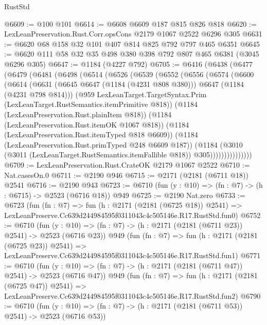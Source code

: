 \begin{lexlean}{RustStd}
\begin{coremodule}
@6609 := @100 @101
@6614 := @6608 @6609 @187 @815 @826 @818
@6620 := LexLeanPreservation.Rust.Corr.opsCons @2179 @1067 @2522 @6296 @305
@6631 := @6620 @68 @158 @32 @101 @407 @814 @825 @792 @797 @465 @6351
@6645 := @6620 @111 @58 @32 @35 @498 @380 @398 @792 @807 @465 @6381 (@3045 @6296 @305)
@6647 := @1184 (@4227 @792)
@6705 := @6416
    (@6438
      (@6477
        (@6479
          (@6481
            (@6498
              (@6514
                (@6526
                  (@6539
                    (@6552
                      (@6556
                        (@6574
                          (@6600
                            (@6614
                              (@6631
                                (@6645 @6647 (@1184 (@4231 @808 @380)))
                                @6647
                                (@1184 (@4231 @798 @814)))
                              (@959
                                LexLeanTarget.TargetSyntax.Prim
                                (LexLeanTarget.RustSemantics.itemPrimitive @818))
                              (@1184 (LexLeanPreservation.Rust.plainItem @818))
                              (@1184 (LexLeanPreservation.Rust.itemOK @1067 @818))
                              (@1184 (LexLeanPreservation.Rust.itemTyped @818 @6609))
                              (@1184 (LexLeanPreservation.Rust.primTyped @248 @6609 @187))
                              (@1184
                                (@3010
                                  (@3011 (LexLeanTarget.RustSemantics.itemFallible @818))
                                  @305)))))))))))))))
@6709 := LexLeanPreservation.Rust.CrateOK @2179 @1067 @2522
@6710 := Nat.casesOn.{0}
@6711 := @2190 @946
@6715 := @2171 (@2181 (@6711 @18)) @2541
@6716 := @2190 @943
@6723 := @6710 (fun (y : @10) => (fn : @7) -> (h : @6715) -> @2523 (@6716 @18)) @949
@6725 := @2190 Nat.zero
@6733 := @6723
    (fun (fn : @7) =>
    fun (h : @2171 (@2181 (@6725 @18)) @2541) =>
    LexLeanPreserve.Cc639d244984595f0311043c4c505146e.R17.RustStd.fun0)
@6752 := @6710
    (fun (y : @10) => (fn : @7) -> (h : @2171 (@2181 (@6711 @23)) @2541) -> @2523 (@6716 @23))
    @949
    (fun (fn : @7) =>
    fun (h : @2171 (@2181 (@6725 @23)) @2541) =>
    LexLeanPreserve.Cc639d244984595f0311043c4c505146e.R17.RustStd.fun1)
@6771 := @6710
    (fun (y : @10) => (fn : @7) -> (h : @2171 (@2181 (@6711 @47)) @2541) -> @2523 (@6716 @47))
    @949
    (fun (fn : @7) =>
    fun (h : @2171 (@2181 (@6725 @47)) @2541) =>
    LexLeanPreserve.Cc639d244984595f0311043c4c505146e.R17.RustStd.fun2)
@6790 := @6710
    (fun (y : @10) => (fn : @7) -> (h : @2171 (@2181 (@6711 @53)) @2541) -> @2523 (@6716 @53))

\end{coremodule}
\end{lexlean}
